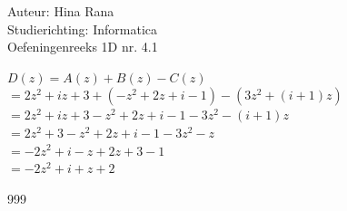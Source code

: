 \documentclass[a4paper]{article}
\begin{document}
\noindent \large Auteur: Hina Rana \\
\noindent \large Studierichting: Informatica\\
\noindent \large Oefeningenreeks 1D nr. 4.1\\

\medskip

\normalsize
$D(z) =A(z) +B(z) - C(z)$\\

$= 2z^2 + iz + 3 + (-z^2 +2z +i-1) - (3z^2 + (i+1)z)$\\

$=2z^2 +iz+3-z^2+2z+i-1-3z^2-(i+1)z$\\

$=2z^2+3-z^2+2z+i-1-3z^2-z$\\

$=-2z^2+i-z+2z+3-1$ \\

$= -2z^2 +i+z+2$

\begin{thebibliography}{999}

\end{thebibliography}
\end{document}
